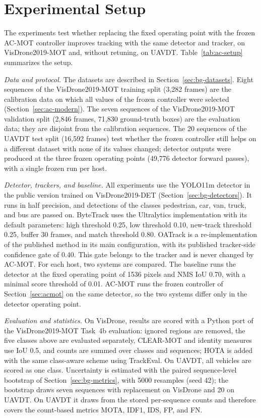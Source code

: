 \section{Experimental Setup}\label{sec:ac-setup}
The experiments test whether replacing the fixed operating point with the frozen AC-MOT controller improves tracking with the same detector and tracker, on VisDrone2019-MOT and, without retuning, on UAVDT. Table~\ref{tab:ac-setup} summarizes the setup.

\emph{Data and protocol.} The datasets are described in Section~\ref{sec:bg-datasets}. Eight sequences of the VisDrone2019-MOT training split (3,282 frames) are the calibration data on which all values of the frozen controller were selected (Section~\ref{sec:ac-modern}). The seven sequences of the VisDrone2019-MOT validation split (2,846 frames, 71,830 ground-truth boxes) are the evaluation data; they are disjoint from the calibration sequences. The 20 sequences of the UAVDT test split (16,592 frames) test whether the frozen controller still helps on a different dataset with none of its values changed; detector outputs were produced at the three frozen operating points (49,776 detector forward passes), with a single frozen run per host.

\emph{Detector, trackers, and baseline.} All experiments use the YOLO11m detector \cite{jocher2024yolo11} in the public version trained on VisDrone2019-DET (Section~\ref{sec:bg-detectors}). It runs in half precision, and detections of the classes pedestrian, car, van, truck, and bus are passed on. ByteTrack uses the Ultralytics implementation with its default parameters: high threshold 0.25, low threshold 0.10, new-track threshold 0.25, buffer 30 frames, and match threshold 0.80. OATrack is a re-implementation of the published method \cite{qi2026oatrack} in its main configuration, with its published tracker-side confidence gate of 0.40. This gate belongs to the tracker and is never changed by AC-MOT. For each host, two systems are compared. The baseline runs the detector at the fixed operating point of 1536 pixels and NMS IoU 0.70, with a minimal score threshold of 0.01. AC-MOT runs the frozen controller of Section~\ref{sec:acmot} on the same detector, so the two systems differ only in the detector operating point.

\emph{Evaluation and statistics.} On VisDrone, results are scored with a Python port of the VisDrone2019-MOT Task~4b evaluation: ignored regions are removed, the five classes above are evaluated separately, CLEAR-MOT and identity measures use IoU 0.5, and counts are summed over classes and sequences; HOTA is added with the same class-aware scheme using TrackEval. On UAVDT, all vehicles are scored as one class. Uncertainty is estimated with the paired sequence-level bootstrap of Section~\ref{sec:bg-metrics}, with 5000 resamples (seed 42); the bootstrap draws seven sequences with replacement on VisDrone and 20 on UAVDT. On UAVDT it draws from the stored per-sequence counts and therefore covers the count-based metrics MOTA, IDF1, IDS, FP, and FN.

